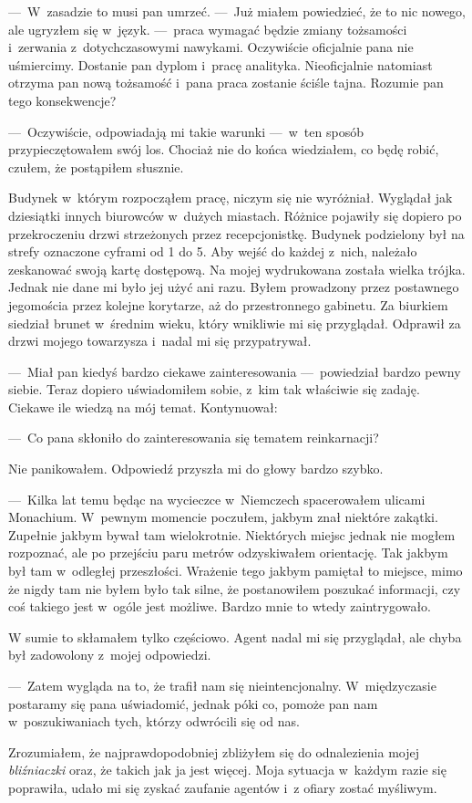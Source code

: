---~W~zasadzie to musi pan umrzeć. ---~Już miałem powiedzieć, że to nic nowego, ale ugryzłem się w~język. ---~praca wymagać będzie zmiany tożsamości i~zerwania z~dotychczasowymi nawykami. Oczywiście oficjalnie pana nie uśmiercimy. Dostanie pan dyplom i~pracę analityka. Nieoficjalnie natomiast otrzyma pan nową tożsamość i~pana praca zostanie ściśle tajna. Rozumie pan tego konsekwencje? 

---~Oczywiście, odpowiadają mi takie warunki ---~w~ten sposób przypieczętowałem swój los. Chociaż nie do końca wiedziałem, co będę robić, czułem, że postąpiłem słusznie. 

Budynek w~którym rozpocząłem pracę, niczym się nie wyróżniał. Wyglądał jak dziesiątki innych biurowców w~dużych miastach. Różnice pojawiły się dopiero po przekroczeniu drzwi strzeżonych przez recepcjonistkę. Budynek podzielony był na strefy oznaczone cyframi od 1 do 5. Aby wejść do każdej z~nich, należało zeskanować swoją kartę dostępową. Na mojej wydrukowana została wielka trójka. Jednak nie dane mi było jej użyć ani razu. Byłem prowadzony przez postawnego jegomościa przez kolejne korytarze, aż do przestronnego gabinetu. Za biurkiem siedział brunet w~średnim wieku, który wnikliwie mi się przyglądał. Odprawił za drzwi mojego towarzysza i~nadal mi się przypatrywał. 

---~Miał pan kiedyś bardzo ciekawe zainteresowania ---~powiedział bardzo pewny siebie. Teraz dopiero uświadomiłem sobie, z~kim tak właściwie się zadaję. Ciekawe ile wiedzą na mój temat. Kontynuował:

---~Co pana skłoniło do zainteresowania się tematem reinkarnacji? 

Nie panikowałem. Odpowiedź przyszła mi do głowy bardzo szybko. 

---~Kilka lat temu  będąc na wycieczce w~Niemczech spacerowałem ulicami Monachium. W~pewnym momencie poczułem, jakbym znał niektóre zakątki. Zupełnie jakbym bywał tam wielokrotnie. Niektórych miejsc jednak nie mogłem rozpoznać, ale po przejściu paru metrów odzyskiwałem orientację. Tak jakbym był tam w~odległej przeszłości. Wrażenie tego jakbym pamiętał to miejsce, mimo że nigdy tam nie byłem było tak silne, że postanowiłem poszukać informacji, czy coś takiego jest w~ogóle jest możliwe. Bardzo mnie to wtedy zaintrygowało.

W sumie to skłamałem tylko częściowo. Agent nadal mi się przyglądał, ale chyba był zadowolony z~mojej odpowiedzi. 

---~Zatem wygląda na to, że trafił nam się nieintencjonalny. W~międzyczasie postaramy się pana uświadomić, jednak póki co, pomoże pan nam w~poszukiwaniach tych, którzy odwrócili się od nas. 

Zrozumiałem, że najprawdopodobniej zbliżyłem się do odnalezienia mojej \emph{bliźniaczki} oraz, że takich jak ja jest więcej. Moja sytuacja w~każdym razie się poprawiła, udało mi się zyskać zaufanie agentów i~z ofiary zostać myśliwym. 
